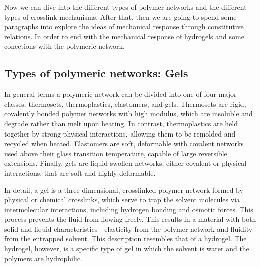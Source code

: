Now we can dive into the different types of polymer networks and the different types of crosslink mechanisms.
After that, then we are going to spend some paragraphs into explore the ideas of mechanical response through constitutive relations.
In order to end with the mechanical response of hydrogels and some conections with the polymeric network.

\subsection{Types of polymeric networks: Gels}

In general terms a polymeric network can be divided into one of four major classes: 
    thermosets,
    thermoplastics,
    elastomers,
    and gels.
Thermosets are rigid, covalently bonded polymer networks with high modulus, which are insoluble and degrade rather than melt upon heating. 
In contrast, thermoplastics are held together by strong physical interactions, allowing them to be remolded and recycled when heated. 
Elastomers are soft, deformable with covalent networks used above their glass transition temperature, capable of large reversible extensions. 
Finally, gels are liquid-swollen networks, either covalent or physical interactions, that are soft and highly deformable.

In detail, a gel is a three-dimensional, crosslinked polymer network formed by physical or chemical crosslinks, which serve to trap the solvent molecules via intermolecular interactions, including hydrogen bonding and osmotic forces. This process prevents the fluid from flowing freely.
This results in a material with both solid and liquid characteristics—elasticity from the polymer network and fluidity from the entrapped solvent.
This description resembles that of a hydrogel.
The hydrogel, however, is a specific type of gel in which the solvent is water and the polymers are hydrophilic.

